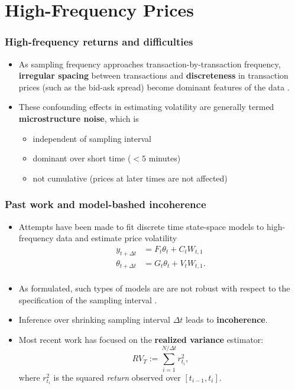 \documentclass{beamer}
\begin{document}
\section{High-Frequency Prices}
\begin{frame}
  \frametitle{High-frequency returns and difficulties}
  \begin{itemize}
  \item As sampling frequency approaches transaction-by-transaction
    frequency, \textbf{irregular spacing} between transactions and 
    \textbf{discreteness} in transaction prices (such as the bid-ask
    spread) become dominant features of the data
    \citep{stoll2000presidential}.

  \item These confounding effects in estimating volatility are
    generally termed \textbf{microstructure noise}, which is

    \begin{itemize}
    \item independent of sampling interval
    \item dominant over short time ($<5$ minutes)
    \item not cumulative (prices at later times are not affected)
    \end{itemize}

  \end{itemize}
\end{frame}
\begin{frame}
  \frametitle{Past work and model-bashed incoherence}
  \begin{itemize}
  \item Attempts have been made to fit discrete time state-space
    models to high-frequency data and estimate price volatility
    \citep{bollerslev1986,andersen1997intraday}
    \begin{align*}
      y_{t+\Delta t} &= F_{t} \theta_t + C_t W_{t,1} \\
      \theta_{t+\Delta t} &= G_{t} \theta_t + V_t W_{t,1}. \\
    \end{align*}

  \item As formulated, such types of models are are not
    robust with respect to the specification of the sampling interval
    \citep{drost1993aggregation, andersen1997intraday,
      zumbach2000pitfalls}.

  \item Inference over shrinking sampling interval $\Delta t$ leads to
    \textbf{incoherence}.

  \item Most recent work has focused on the \textbf{realized variance} \cite{comte1998long} estimator:
    \[
      RV_T := \sum_{i=1}^{N/\Delta t} r_{t_i}^2,
    \]
    where $r_{t_i}^2$ is the squared \textit{return} observed over $[t_{i-1}, t_i]$.
  \end{itemize}
\end{frame}
\end{document}

